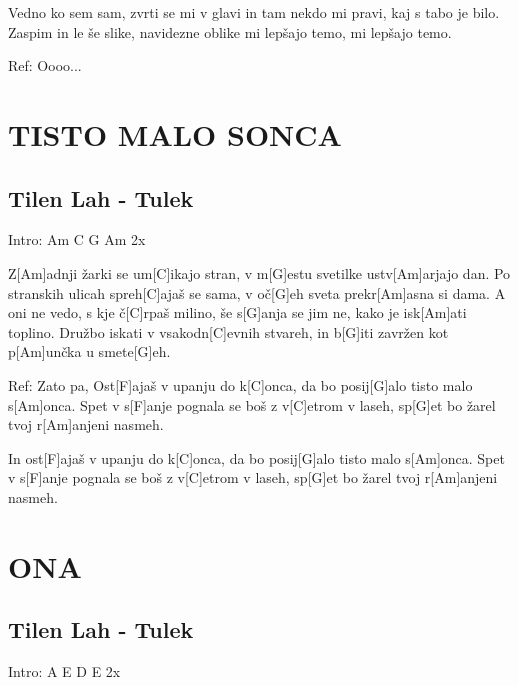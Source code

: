 \documentclass{article}
\begin{document}
\begin{multicols}{2}
\begin{guitar}
	Vedno ko sem sam, zvrti se mi v glavi
	in tam nekdo mi pravi, kaj s tabo je bilo.
	Zaspim in le še slike, navidezne oblike
	mi lepšajo temo, mi lepšajo temo.
	\linebreak

	Ref:
	Oooo...

\end{guitar}
\pagebreak

\section*{TISTO MALO SONCA}
%
\subsection*{Tilen Lah - Tulek}
\begin{guitar}
	Intro: Am C G Am 2x

	Z[Am]adnji žarki se um[C]ikajo stran,
	v m[G]estu svetilke ustv[Am]arjajo dan.
	Po stranskih ulicah spreh[C]ajaš se sama,
	v oč[G]eh sveta prekr[Am]asna si dama.
	A oni ne vedo, s kje č[C]rpaš milino,
	še s[G]anja se jim ne, kako je isk[Am]ati toplino.
	Družbo iskati v vsakodn[C]evnih stvareh,
	in b[G]iti zavržen kot p[Am]unčka u smete[G]eh.
	\linebreak
	
	Ref:
	Zato pa,
	Ost[F]ajaš v upanju do k[C]onca,
	da bo posij[G]alo tisto malo s[Am]onca.
	Spet v s[F]anje pognala se boš z v[C]etrom v laseh,
	sp[G]et bo žarel tvoj r[Am]anjeni nasmeh.
	\linebreak

	In ost[F]ajaš v upanju do k[C]onca,
	da bo posij[G]alo tisto malo s[Am]onca.
	Spet v s[F]anje pognala se boš z v[C]etrom v laseh,
	sp[G]et bo žarel tvoj r[Am]anjeni nasmeh.
	\linebreak

\end{guitar}
\pagebreak

\section*{ONA}
%
\subsection*{Tilen Lah - Tulek}
\begin{guitar}
	Intro: A E D E 2x


\end{guitar}
\end{multicols}
\end{document}
